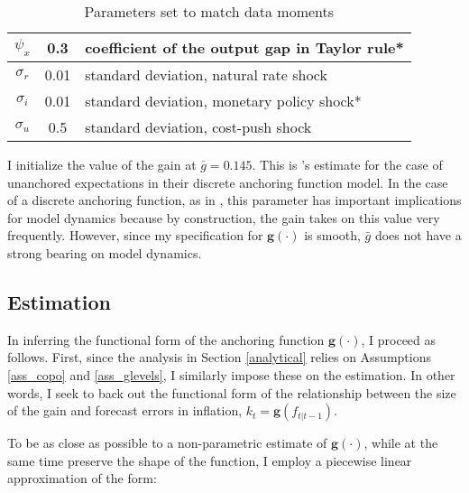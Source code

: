 \documentclass[11pt]{article}
\renewcommand{\[}{\begin{equation}}
\renewcommand{\]}{\end{equation}}
\def\meanalph{(0.82;    0.61;    0;    0.33;    0.45)}
\begin{document}
\begin{center}
\begin{table}
\begin{tabular}{ c | c  | l }
\hline
    $\psi_x$ & 0.3   & coefficient of the output gap in Taylor rule*  \\\hline %
    $\sigma_r$ & 0.01 & standard deviation, natural rate shock  \\ \hline
    $\sigma_i$ &  0.01  &standard deviation, monetary policy shock*  \\ \hline
    $\sigma_u$ & 0.5 & standard deviation, cost-push shock   \\ \hline  
\end{tabular}     
      \caption{Parameters set to match data moments}  \label{calibration_moments}
 \end{table}
\end{center}


I initialize the value of the gain at $\bar{g}=0.145$. This is \cite{carvalho2019anchored}'s estimate for the case of unanchored expectations in their discrete anchoring function model. In the case of a discrete anchoring function, as in \cite{carvalho2019anchored}, this parameter has important implications for model dynamics because by construction, the gain takes on this value very frequently. However, since my specification for $\mathbf{g}(\cdot)$ is smooth, $\bar{g}$ does not have a strong bearing on model dynamics. 

\subsection{Estimation}

In inferring the functional form of the anchoring function $\mathbf{g}(\cdot)$, I proceed as follows. First, since the analysis in Section \ref{analytical} relies on Assumptions  \ref{ass_copo} and \ref{ass_glevels}, I similarly impose these on the estimation. In other words, I seek to back out the functional form of the relationship between the size of the gain and forecast errors in inflation, $k_t = \mathbf{g}(f_{t|t-1})$. 

To be as close as possible to a non-parametric estimate of $\mathbf{g}(\cdot)$, while at the same time preserve the shape of the function, I employ a piecewise linear approximation of the form:
\end{document}
